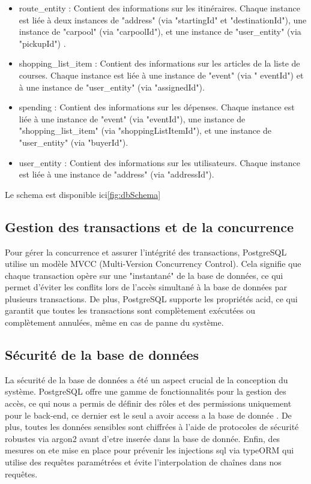 \begin{itemize}
    \item route\_entity : Contient des informations sur les itinéraires.
    Chaque instance est liée à deux instances de "address" (via "startingId" et "destinationId"), une instance de "carpool" (via "carpoolId"), et une instance de "user\_entity" (via "pickupId") .\\
    \item shopping\_list\_item : Contient des informations sur les articles de la liste de courses.
    Chaque instance est liée à une instance de "event" (via " eventId") et à une instance de "user\_entity" (via "assignedId").\\
    \item spending : Contient des informations sur les dépenses.
    Chaque instance est liée à une instance de "event" (via "eventId"), une instance de "shopping\_list\_item" (via "shoppingListItemId"), et une instance de "user\_entity" (via "buyerId").\\
    \item user\_entity : Contient des informations sur les utilisateurs.
    Chaque instance est liée à une instance de "address" (via "addressId").\\
\end{itemize}

Le schema est disponible ici\ref{fig:dbSchema}%

\subsection{Gestion des transactions et de la concurrence}\label{subsec:transaction-concurrency}
Pour gérer la concurrence et assurer l'intégrité des transactions, PostgreSQL utilise un modèle MVCC (Multi-Version Concurrency Control).
Cela signifie que chaque transaction opère sur une "instantané" de la base de données, ce qui permet d'éviter les conflits lors de l'accès simultané à la base de données par plusieurs transactions.
De plus, PostgreSQL supporte les propriétés \Gls{acid}, ce qui garantit que toutes les transactions sont complètement exécutées ou complètement annulées, même en cas de panne du système.\\

\subsection{Sécurité de la base de données}\label{subsec:database-security}
La sécurité de la base de données a été un aspect crucial de la conception du système.
PostgreSQL offre une gamme de fonctionnalités pour la gestion des accès, ce qui nous a permis de définir des rôles et des permissions uniquement pour le back-end, ce dernier est le seul a avoir access a la base de donnée .
De plus, toutes les données sensibles sont chiffrées à l'aide de protocoles de sécurité robustes via argon2 avant d'etre inserée dans la base de donnée.
Enfin, des mesures on ete mise en place pour prévenir les injections \Gls{sql} via typeORM qui utilise des requêtes paramétrées et évite l'interpolation de chaînes dans nos requêtes.\\

